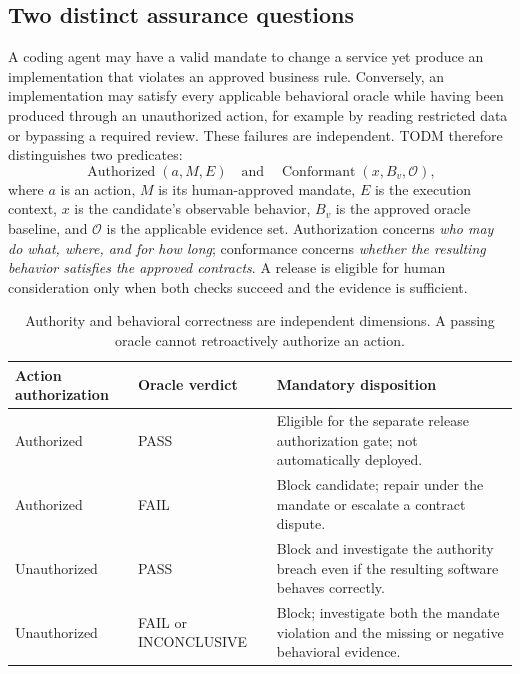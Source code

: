 \documentclass[11pt,a4paper]{article}
\newcommand{\PASS}{\textsf{PASS}}
\newcommand{\FAIL}{\textsf{FAIL}}
\newcommand{\INC}{\textsf{INCONCLUSIVE}}
\begin{document}
\subsection{Two distinct assurance questions}
A coding agent may have a valid mandate to change a service yet produce an implementation that violates an approved business rule. Conversely, an implementation may satisfy every applicable behavioral oracle while having been produced through an unauthorized action, for example by reading restricted data or bypassing a required review. These failures are independent. TODM therefore distinguishes two predicates:
\begin{equation}
  \operatorname{Authorized}(a,M,E) \quad\text{and}\quad
  \operatorname{Conformant}(x,B_v,\mathcal{O}),
\end{equation}
where $a$ is an action, $M$ is its human-approved mandate, $E$ is the execution context, $x$ is the candidate's observable behavior, $B_v$ is the approved oracle baseline, and $\mathcal{O}$ is the applicable evidence set. Authorization concerns \emph{who may do what, where, and for how long}; conformance concerns \emph{whether the resulting behavior satisfies the approved contracts}. A release is eligible for human consideration only when both checks succeed and the evidence is sufficient.

\begin{table}[htbp]
\centering\small
\caption{Authority and behavioral correctness are independent dimensions. A passing oracle cannot retroactively authorize an action.}
\begin{tabularx}{\linewidth}{@{}p{28mm}p{30mm}X@{}}
\toprule
Action authorization & Oracle verdict & Mandatory disposition \\
\midrule
Authorized & \PASS{} & Eligible for the separate release authorization gate; not automatically deployed. \\
Authorized & \FAIL{} & Block candidate; repair under the mandate or escalate a contract dispute. \\
Unauthorized & \PASS{} & Block and investigate the authority breach even if the resulting software behaves correctly. \\
Unauthorized & \FAIL{} or \INC{} & Block; investigate both the mandate violation and the missing or negative behavioral evidence. \\
\bottomrule
\end{tabularx}
\label{tab:authority}
\end{table}
\end{document}
